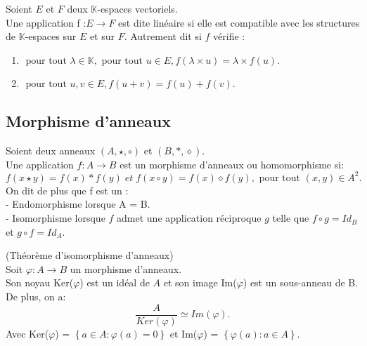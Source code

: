 \begin{madefinition}
	Soient $E$ et $F$ deux $\mathbb{K}$-espaces vectoriels.\\ Une application f :$E \longrightarrow F$ est dite linéaire si elle est compatible avec les structures de $\mathbb{K}$-espaces sur $E$ et sur $F$. Autrement dit si $f$ vérifie : 
	\begin{enumerate}
		\item $\text{ pour tout } \lambda \in \mathbb{K}, \text{ pour tout } u \in E, f(\lambda \times u) = \lambda \times f(u)$.
		\item $\text{ pour tout } u,v \in E, f(u+v) = f(u)+f(v)$.
	\end{enumerate}
\end{madefinition}

\subsection{Morphisme d'anneaux}
\begin{madefinition}
	Soient deux anneaux $(A,\star, \circ )$ et $(B, \ast, \diamond)$.\\
	Une application $f:A \longrightarrow B$ est un morphisme d'anneaux  ou homomorphisme si:
	\[ f(x \star y) = f(x) \ast f(y) \; et \; f(x \circ y) = f(x) \diamond f(y), \text{ pour tout } (x,y) \in A^2.\]
	On dit de plus que f est un :\\
	- Endomorphisme lorsque A = B.\\
	- Isomorphisme lorsque $f$ admet une application réciproque $g$ telle que $f \circ g = Id_B$ et $g \circ f = Id_A$. 
\end{madefinition}
\begin{maproposition}
	(Théorème d'isomorphisme d’anneaux) \\
	Soit $\varphi:A \longrightarrow B$ un morphisme d'anneaux.\\
	Son noyau Ker($\varphi$) est un idéal de $A$ et son image Im($\varphi$) est un sous-anneau de B.\\ De plus, on a:
	\[ \dfrac{A}{Ker(\varphi)} \simeq  Im(\varphi).\]
	Avec Ker($\varphi$) = $\left\{a \in A : \varphi(a) = 0 \right\}$ 
	et Im($\varphi$) = $\left\{\varphi(a) : a \in A \right\}$.
\end{maproposition}
